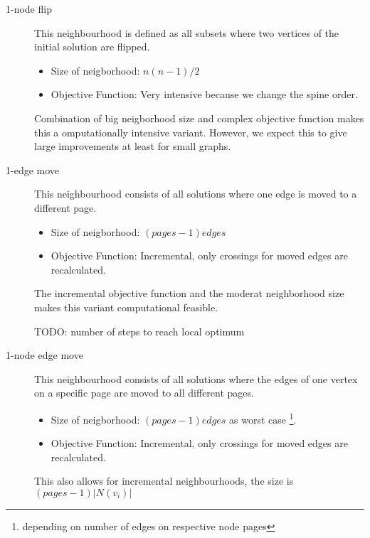 \documentclass{scrartcl}
\begin{document}
\begin{description}
\item[1-node flip] 
    
    This neighbourhood is defined as all subsets where two vertices of the initial solution are flipped. 
    \begin{itemize}
        \item Size of neigborhood: $n(n-1)/2$
        \item Objective Function: Very intensive because we change the spine order.

    \end{itemize}

    Combination of big neigborhood size and complex objective function makes this  a omputationally intensive variant.
    However, we expect this to give large improvements at least for small graphs.

	
\item[1-edge move] This neighbourhood consists of all solutions where one edge is moved to a different page. 
     \begin{itemize}
        \item Size of neigborhood: $(pages-1) edges$ 
        \item Objective Function: Incremental, only crossings for moved edges are recalculated.
    \end{itemize}
   
    The incremental objective function and the moderat neighborhood size makes this variant computational feasible.

    TODO: number of steps to reach local optimum
	
\item[1-node edge move] This neighbourhood consists of all solutions where the edges of
	one vertex on a specific page are moved to all different pages. 

    \begin{itemize}
        \item Size of neigborhood: $(pages-1) edges$ as worst case \footnote{depending on number of edges on respective node pages}.
        \item Objective Function: Incremental, only crossings for moved edges are recalculated.
    \end{itemize}
    
    This also allows for incremental neighbourhoods, the
		size is $(pages-1) |N(v_i)|$

\end{description}
\end{document}

